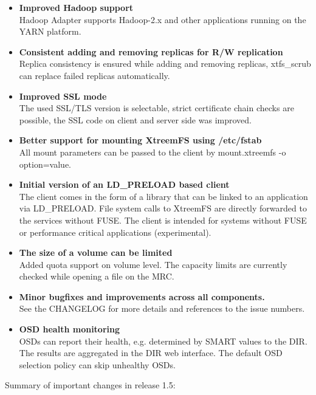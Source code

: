 \documentclass[a4paper,10pt]{book}
\begin{document}
\begin{itemize}
  \item \textbf{Improved Hadoop support}\\
      Hadoop Adapter supports Hadoop-2.x and other applications running on the
      YARN platform.
  \item \textbf{Consistent adding and removing replicas for R/W replication}\\
      Replica consistency is ensured while adding and removing replicas,
      xtfs\_scrub can replace failed replicas automatically.
  \item \textbf{Improved SSL mode}\\
      The used SSL/TLS version is selectable, strict certificate chain checks
      are possible, the SSL code on client and server side was improved.
  \item \textbf{Better support for mounting XtreemFS using /etc/fstab}\\
      All mount parameters can be passed to the client by mount.xtreemfs -o
      option=value.
  \item \textbf{Initial version of an LD\_PRELOAD based client}\\
      The client comes in the form of a library that can be linked to an
      application via LD\_PRELOAD. File system calls to XtreemFS are directly
      forwarded to the services without FUSE. The client is intended for systems
      without FUSE or performance critical applications (experimental).
  \item \textbf{The size of a volume can be limited}\\
      Added quota support on volume level. The capacity limits are currently
      checked while opening a file on the MRC.
  \item \textbf{Minor bugfixes and improvements across all components.}\\
      See the CHANGELOG for more details and references to the issue numbers.
  \item \textbf{OSD health monitoring}\\
      OSDs can report their health, e.g. determined by SMART values to the DIR.
      The results are aggregated in the DIR web interface. The default OSD
      selection policy can skip unhealthy OSDs.
\end{itemize}

Summary of important changes in release 1.5:
\end{document}
